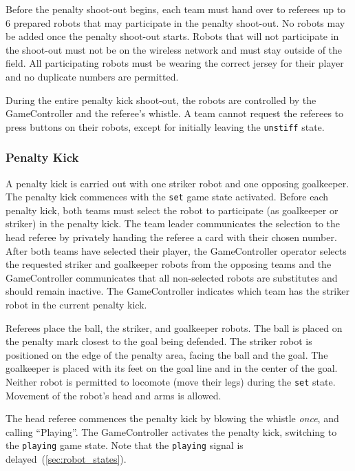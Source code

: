 Before the penalty shoot-out begins, each team must hand over to referees up to 6 prepared robots that may participate in the penalty shoot-out.
No robots may be added once the penalty shoot-out starts.
Robots that will not participate in the shoot-out must not be on the wireless network and must stay outside of the field.
All participating robots must be wearing the correct jersey for their player and no duplicate numbers are permitted.

During the entire penalty kick shoot-out, the robots are controlled by the GameController and the referee's whistle.
A team cannot request the referees to press buttons on their robots, except for initially leaving the \texttt{unstiff} state.

\subsubsection{Penalty Kick}
\label{sec:pso_kick}

A penalty kick is carried out with one striker robot and one opposing goalkeeper.
The penalty kick commences with the \texttt{set} game state activated.
Before each penalty kick, both teams must select the robot to participate (as goalkeeper or striker) in the penalty kick.
The team leader communicates the selection to the head referee by privately handing the referee a card with their chosen number.
After both teams have selected their player, the GameController operator selects the requested striker and goalkeeper robots from the opposing teams and the GameController communicates that all non-selected robots are substitutes and should remain inactive.
The GameController indicates which team has the striker robot in the current penalty kick.

Referees place the ball, the striker, and goalkeeper robots.
The ball is placed on the penalty mark closest to the goal being defended.
The striker robot is positioned on the edge of the penalty area, facing the ball and the goal.
The goalkeeper is placed with its feet on the goal line and in the center of the goal.
Neither robot is permitted to locomote (move their legs) during the \texttt{set} state.
Movement of the robot's head and arms is allowed.

The head referee commences the penalty kick by blowing the whistle \textit{once}, and calling ``Playing''.
The GameController activates the penalty kick, switching to the \texttt{playing} game state.
Note that the \texttt{playing} signal is delayed~(\cf \cref{sec:robot_states}).


